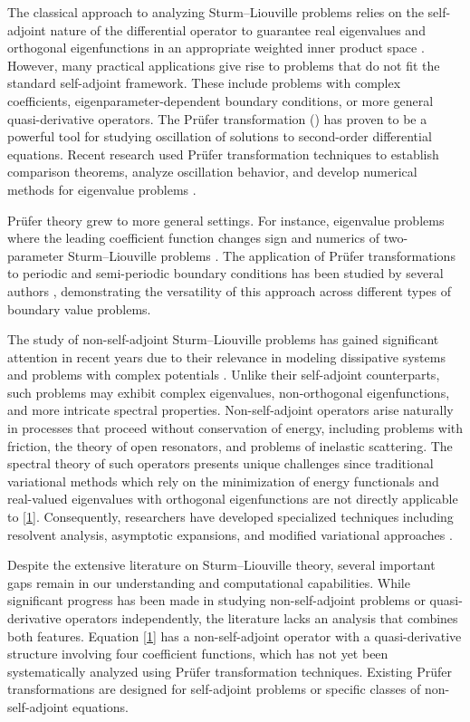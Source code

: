 \documentclass[11pt, reqno]{amsart}
\numberwithin{equation}{section}  %
\theoremstyle{plain}
\theoremstyle{definition}
\theoremstyle{remark}
\begin{document}
The classical approach to analyzing Sturm--Liouville problems relies on the self-adjoint nature of the differential operator to guarantee real eigenvalues and orthogonal eigenfunctions in an appropriate weighted inner product space \cite{zettl2005}. However, many practical applications give rise to problems that do not fit the standard self-adjoint framework. These include problems with complex coefficients, eigenparameter-dependent boundary conditions, or more general quasi-derivative operators. The Pr\"ufer transformation (\cite{prufer1926}) has proven to be a powerful tool for studying oscillation of solutions to second-order differential equations. Recent research used Pr\"ufer transformation techniques to establish comparison theorems, analyze oscillation behavior, and develop numerical methods for eigenvalue problems \cite{atkinson1964, brown1999, kong2001}. 

Pr\"ufer theory grew to more general settings. For instance, eigenvalue problems where the leading coefficient function changes sign \cite{kong1999, kong2003} and numerics of two-parameter Sturm--Liouville problems \cite{binding1993}. The application of Pr\"ufer transformations to periodic and semi-periodic boundary conditions has been studied by several authors \cite{menendez2001, harris2003}, demonstrating the versatility of this approach across different types of boundary value problems. 

The study of non-self-adjoint Sturm--Liouville problems has gained significant attention in recent years due to their relevance in modeling dissipative systems and problems with complex potentials \cite{bondarenko2020}. Unlike their self-adjoint counterparts, such problems may exhibit complex eigenvalues, non-orthogonal eigenfunctions, and more intricate spectral properties. Non-self-adjoint operators arise naturally in processes that proceed without conservation of energy, including problems with friction, the theory of open resonators, and problems of inelastic scattering. The spectral theory of such operators presents unique challenges since traditional variational methods which rely on the minimization of energy functionals and real-valued eigenvalues with orthogonal eigenfunctions are not directly applicable to \eqref{1}. Consequently, researchers have developed specialized techniques including resolvent analysis, asymptotic expansions, and modified variational approaches \cite{davies2007}.

Despite the extensive literature on Sturm--Liouville theory, several important gaps remain in our understanding and computational capabilities. While significant progress has been made in studying non-self-adjoint problems or quasi-derivative operators independently, the literature lacks an analysis that combines both features. Equation \eqref{1} has a non-self-adjoint operator with a quasi-derivative structure involving four coefficient functions, which has not yet been systematically analyzed using Pr\"ufer transformation techniques. Existing Pr\"ufer transformations are designed for self-adjoint problems or specific classes of non-self-adjoint equations. 
\end{document}
